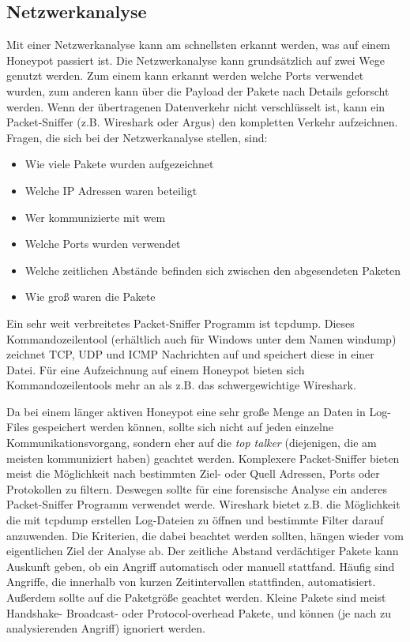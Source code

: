 \subsection{Netzwerkanalyse}
Mit einer Netzwerkanalyse kann am schnellsten erkannt werden, was auf einem Honeypot passiert ist. Die Netzwerkanalyse kann grundsätzlich auf zwei Wege genutzt werden. Zum einem kann erkannt werden welche Ports verwendet wurden, zum anderen kann über die Payload der Pakete nach Details geforscht werden. Wenn der übertragenen Datenverkehr nicht verschlüsselt ist, kann ein Packet-Sniffer (z.B. Wireshark oder Argus) den kompletten Verkehr aufzeichnen. Fragen, die sich bei der Netzwerkanalyse stellen, sind:

\begin{itemize}
\item Wie viele Pakete wurden aufgezeichnet
\item Welche IP Adressen waren beteiligt
\item Wer kommunizierte mit wem
\item Welche Ports wurden verwendet
\item Welche zeitlichen Abstände befinden sich zwischen den abgesendeten Paketen
\item Wie groß waren die Pakete
\end{itemize} 

\noindent Ein sehr weit verbreitetes Packet-Sniffer Programm ist tcpdump. Dieses Kommandozeilentool (erhältlich auch für Windows unter dem Namen windump) zeichnet TCP, UDP und ICMP Nachrichten auf und speichert diese in einer Datei. Für eine Aufzeichnung auf einem Honeypot bieten sich Kommandozeilentools mehr an als z.B. das schwergewichtige Wireshark.

\noindent Da bei einem länger aktiven Honeypot eine sehr große Menge an Daten in Log-Files gespeichert werden können, sollte sich nicht auf jeden einzelne Kommunikationsvorgang, sondern eher auf die \emph{top talker} (diejenigen, die am meisten kommuniziert haben) geachtet werden. Komplexere Packet-Sniffer bieten meist die Möglichkeit nach bestimmten Ziel- oder Quell Adressen, Ports oder Protokollen zu filtern. Deswegen sollte für eine forensische Analyse ein anderes Packet-Sniffer Programm verwendet werde. Wireshark bietet z.B. die Möglichkeit die mit tcpdump erstellen Log-Dateien zu öffnen und bestimmte Filter darauf anzuwenden. Die Kriterien, die dabei beachtet werden sollten, hängen wieder vom eigentlichen Ziel der Analyse ab.
Der zeitliche Abstand verdächtiger Pakete kann Auskunft geben, ob ein Angriff automatisch oder manuell stattfand. Häufig sind Angriffe, die innerhalb von kurzen Zeitintervallen stattfinden, automatisiert. Außerdem sollte auf die Paketgröße geachtet werden. Kleine Pakete sind meist Handshake- Broadcast- oder Protocol-overhead Pakete, und können (je nach zu analysierenden Angriff) ignoriert werden. 

